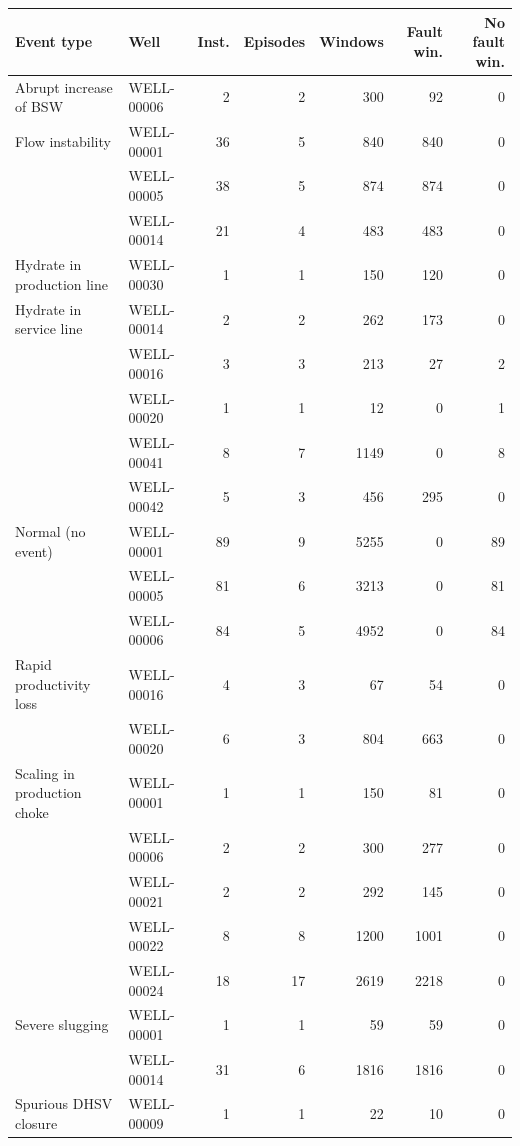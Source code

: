 \begin{tabular}{@{}l l rrrrr@{}}
\toprule
Event type & Well & Inst. & Episodes & Windows & Fault win. & No fault win. \\
\midrule
Abrupt increase of BSW & WELL-00006 & 2 & 2 & 300 & 92 & 0 \\
Flow instability & WELL-00001 & 36 & 5 & 840 & 840 & 0 \\
 & WELL-00005 & 38 & 5 & 874 & 874 & 0 \\
 & WELL-00014 & 21 & 4 & 483 & 483 & 0 \\
Hydrate in production line & WELL-00030 & 1 & 1 & 150 & 120 & 0 \\
Hydrate in service line & WELL-00014 & 2 & 2 & 262 & 173 & 0 \\
 & WELL-00016 & 3 & 3 & 213 & 27 & 2 \\
 & WELL-00020 & 1 & 1 & 12 & 0 & 1 \\
 & WELL-00041 & 8 & 7 & 1149 & 0 & 8 \\
 & WELL-00042 & 5 & 3 & 456 & 295 & 0 \\
Normal (no event) & WELL-00001 & 89 & 9 & 5255 & 0 & 89 \\
 & WELL-00005 & 81 & 6 & 3213 & 0 & 81 \\
 & WELL-00006 & 84 & 5 & 4952 & 0 & 84 \\
Rapid productivity loss & WELL-00016 & 4 & 3 & 67 & 54 & 0 \\
 & WELL-00020 & 6 & 3 & 804 & 663 & 0 \\
Scaling in production choke & WELL-00001 & 1 & 1 & 150 & 81 & 0 \\
 & WELL-00006 & 2 & 2 & 300 & 277 & 0 \\
 & WELL-00021 & 2 & 2 & 292 & 145 & 0 \\
 & WELL-00022 & 8 & 8 & 1200 & 1001 & 0 \\
 & WELL-00024 & 18 & 17 & 2619 & 2218 & 0 \\
Severe slugging & WELL-00001 & 1 & 1 & 59 & 59 & 0 \\
 & WELL-00014 & 31 & 6 & 1816 & 1816 & 0 \\
Spurious DHSV closure & WELL-00009 & 1 & 1 & 22 & 10 & 0 \\
\bottomrule
\end{tabular}
